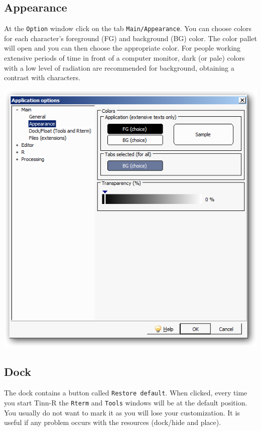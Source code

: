 \subsection{Appearance}

At the \texttt{Option} window click on the tab \texttt{Main/Appearance}.
You can choose colors for each character's foreground (FG) and background (BG) color.
The color pallet will open and you can then choose the appropriate color.
For people working extensive periods of time in front of a computer monitor,
dark (or pale) colors with a low level of radiation are recommended for background,
obtaining a contrast with characters.

\includegraphics[scale=0.50]{./res/app_main_appearance.png}

\subsection{Dock}

The dock contains a button called \texttt{Restore default}.
When clicked, every time you start Tinn-R the \texttt{Rterm} and \texttt{Tools} windows will be at the default position.
You usually do not want to mark it as you will lose your customization.
It is useful if any problem occurs with the resources (dock/hide and place).


